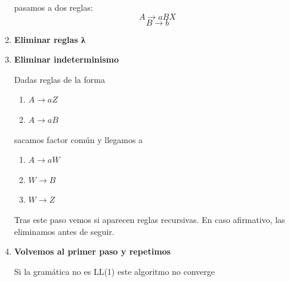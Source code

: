 \documentclass{apuntes}
\begin{document}
\begin{enumerate}
pasamos a dos reglas:
\[A \rightarrow aBX\]
\[B \rightarrow b\]

\item \textbf{Eliminar reglas λ}
\item \textbf{Eliminar indeterminismo}

Dadas reglas de la forma
\begin{enumerate}
\item $A \rightarrow aZ$
\item $A \rightarrow aB$
\end{enumerate}
sacamos factor común y llegamos a
\begin{enumerate}
\item $A \rightarrow aW$
\item $W \rightarrow B$
\item $W \rightarrow Z$
\end{enumerate}

Tras este paso vemos si aparecen reglas recursivas. En caso afirmativo, las eliminamos antes de seguir.
\item \textbf{Volvemos al primer paso y repetimos}

\obs Si la gramática no es LL(1) este algoritmo no converge
\end{enumerate}
\end{document}
